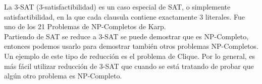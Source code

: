 \documentclass[12pt]{report}
\begin{document}
La 3-SAT (3-satisfactibilidad) es un caso especial de SAT, o simplemente satisfactibilidad, en la que cada clausula contiene exactamente 3 literales. Fue uno de los 21 Problemas de NP-Completos de Karp.\\
Partiendo de SAT se reduce a 3-SAT se puede demostrar que es NP-Completo, entonces podemos usarlo para demostrar también otros problemas NP-Completos. Un ejemplo de este tipo de reducción es el problema de Clique. Por lo general, es más fácil utilizar reducción de 3-SAT que cuando se está tratando de probar que algún otro problema es NP-Completo.\\
\end{document}
